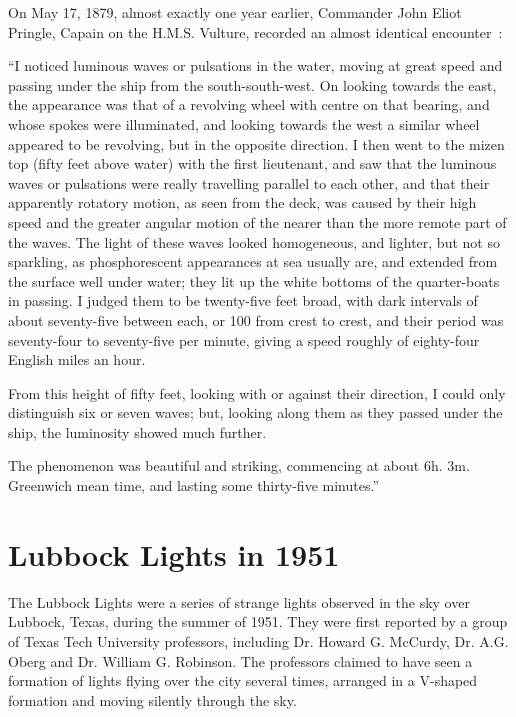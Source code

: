 On May 17, 1879, almost exactly one year earlier,
Commander John Eliot Pringle, Capain on the H.M.S. Vulture,  recorded an almost identical encounter~\cite{Pringle1879}:
\begin{svgraybox}
``I noticed luminous waves or pulsations in the water, moving at great speed and passing under the ship from the south-south-west. On looking towards the east, the appearance was that of a revolving wheel with centre on that bearing, and whose spokes were illuminated, and looking towards the west a similar wheel appeared to be revolving, but in the opposite direction. I then went to the mizen top (fifty feet above water) with the first lieutenant, and saw that the luminous waves or pulsations were really travelling parallel to each other, and that their apparently rotatory motion, as seen from the deck, was caused by their high speed and the greater angular motion of the nearer than the more remote part of the waves. The light of these waves looked homogeneous, and lighter, but not so sparkling, as phosphorescent appearances at sea usually are, and extended from the surface well under water; they lit up the white bottoms of the quarter-boats in passing. I judged them to be twenty-five feet broad, with dark intervals of about seventy-five between each, or 100 from crest to crest, and their period was seventy-four to seventy-five per minute, giving a speed roughly of eighty-four English miles an hour.

From this height of fifty feet, looking with or against their direction, I could only distinguish six or seven waves; but, looking along them as they passed under the ship, the luminosity showed much further.

The phenomenon was beautiful and striking, commencing at about 6h. 3m. Greenwich mean time, and lasting some thirty-five minutes.''
\end{svgraybox}


\section{Lubbock Lights in 1951}

\label{2023-UFO-part-History-chapter-post-1945-pre-1953.tex-ll1951}
The Lubbock Lights were a series of strange lights observed in the sky over Lubbock, Texas, during the summer of 1951. They were first reported by a group of Texas Tech University professors, including Dr. Howard G. McCurdy, Dr. A.G. Oberg and Dr. William G. Robinson. The professors claimed to have seen a formation of lights flying over the city several times, arranged in a V-shaped formation and moving silently through the sky.

